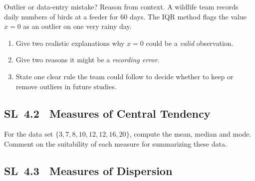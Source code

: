 \documentclass[11pt]{article}
\def\textbf#1{#1}%
\newcommand{\tocsubsection}[1]{\subsection{#1}}
\newcounter{question}
\begin{document}

\begin{question}
\textbf{Outlier or data-entry mistake? Reason from context.}
A wildlife team records daily numbers of birds at a feeder for 60 days. The IQR method flags the value $x=0$ as an outlier on one very rainy day.
\begin{enumerate}
  \item Give two realistic explanations why $x=0$ could be a \emph{valid} observation.
  \item Give two reasons it might be a \emph{recording error}.
  \item State one clear rule the team could follow to decide whether to keep or remove outliers in future studies.
\end{enumerate}
\end{question}






\tocsubsection{SL 4.2 \; Measures of Central Tendency}

\begin{question}
For the data set $\{3,7,8,10,12,12,16,20\}$, compute the mean, median and
mode.  Comment on the suitability of each measure for summarizing these data.
\end{question}

\tocsubsection{SL 4.3 \; Measures of Dispersion}

\end{document}
